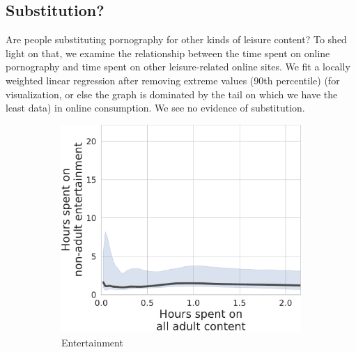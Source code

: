\documentclass[12pt,twoside]{article}
\begin{document}
\subsection{Substitution?}
Are people substituting pornography for other kinds of leisure content? To shed light on that, we examine the relationship between the time spent on online pornography and time spent on other leisure-related online sites. We fit a locally weighted linear regression after removing extreme values (90th percentile) (for visualization, or else the graph is dominated by the tail on which we have the least data) in online consumption. We see no evidence of substitution.

\begin{figure}[!ht]
\label{fig:tu_prop_entertainment-prop_adult_duration}
     \centering
     \begin{subfigure}[b]{0.495\textwidth}
         \centering
         \includegraphics[width=\textwidth]{figs/tu_duration_entertainment-duration_adult.pdf}
         \caption{Entertainment}
     \end{subfigure}
     \hfill
     \begin{subfigure}[b]{0.495\textwidth}
         \centering

\end{subfigure}
\end{figure}
\end{document}

